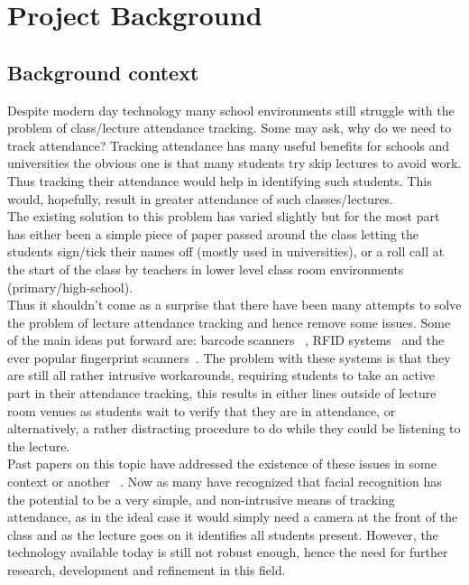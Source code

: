 \section{Project Background}
	\subsection{Background context}
		Despite modern day technology many school environments still struggle with the problem of class/lecture 
		attendance tracking.  Some may ask, why do we need to track attendance?  Tracking attendance 
		has many useful benefits for schools and universities the obvious one is that many students try skip 
		lectures to avoid work.  Thus tracking their attendance would help in identifying such students.  This 
		would, hopefully, result in greater attendance of such classes/lectures. \\

		The existing solution to this problem has varied slightly but for the most part has either been a simple 
		piece of paper passed around the class letting the students sign/tick their names off (mostly used in 
		universities), or a roll call at the start of the class by teachers in lower level class room environments 
		(primary/high-school).  \\

		Thus it shouldn't come as a surprise that there have been many attempts to solve the problem of lecture 
		attendance tracking and hence remove some issues.  Some of the main ideas put forward are: barcode scanners
		~\cite{barcode}, RFID systems~\cite{RFID} and the ever popular fingerprint scanners~\cite{fingerprintsystems}.  
		The problem with these systems is that they are still all rather intrusive workarounds, requiring students to 
		take an active part in their attendance tracking, this results in either lines outside of lecture room venues 
		as students wait to verify that they are in attendance, or alternatively, a rather distracting procedure to do 
		while they could be listening to the lecture. \\

		Past papers on this topic have addressed the existence of these issues in some context or another
		~\cite{PatelDoaSAMSURaFR,BalcohAfEAM,KarheSASAUFR}.  Now as many have recognized that facial recognition has 
		the potential to be a very simple, and non-intrusive means of tracking attendance, as in the ideal case it
		would simply need a camera at the front of the class and as the lecture goes on it identifies all students 
		present.  However, the technology available today is still not robust enough, hence the need for further 
		research, development and refinement in this field.  \\
		
